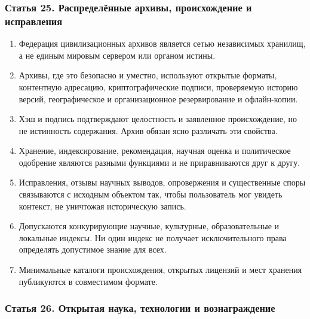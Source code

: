 \documentclass[
  russian,
  11pt,
  a4paper,
]{article}
\providecommand{\tightlist}{%
  \setlength{\itemsep}{0pt}\setlength{\parskip}{0pt}}
\begin{document}
\subsubsection{Статья 25. Распределённые архивы, происхождение и
исправления}\label{ux441ux442ux430ux442ux44cux44f-25-ux440ux430ux441ux43fux440ux435ux434ux435ux43bux451ux43dux43dux44bux435-ux430ux440ux445ux438ux432ux44b-ux43fux440ux43eux438ux441ux445ux43eux436ux434ux435ux43dux438ux435-ux438-ux438ux441ux43fux440ux430ux432ux43bux435ux43dux438ux44f}

\begin{enumerate}
\def\labelenumi{\arabic{enumi}.}
\tightlist
\item
  Федерация цивилизационных архивов является сетью независимых хранилищ,
  а не единым мировым сервером или органом истины.
\item
  Архивы, где это безопасно и уместно, используют открытые форматы,
  контентную адресацию, криптографические подписи, проверяемую историю
  версий, географическое и организационное резервирование и
  офлайн-копии.
\item
  Хэш и подпись подтверждают целостность и заявленное происхождение, но
  не истинность содержания. Архив обязан ясно различать эти свойства.
\item
  Хранение, индексирование, рекомендация, научная оценка и политическое
  одобрение являются разными функциями и не приравниваются друг к другу.
\item
  Исправления, отзывы научных выводов, опровержения и существенные споры
  связываются с исходным объектом так, чтобы пользователь мог увидеть
  контекст, не уничтожая историческую запись.
\item
  Допускаются конкурирующие научные, культурные, образовательные и
  локальные индексы. Ни один индекс не получает исключительного права
  определять допустимое знание для всех.
\item
  Минимальные каталоги происхождения, открытых лицензий и мест хранения
  публикуются в совместимом формате.
\end{enumerate}

\subsubsection{Статья 26. Открытая наука, технологии и
вознаграждение}\label{ux441ux442ux430ux442ux44cux44f-26-ux43eux442ux43aux440ux44bux442ux430ux44f-ux43dux430ux443ux43aux430-ux442ux435ux445ux43dux43eux43bux43eux433ux438ux438-ux438-ux432ux43eux437ux43dux430ux433ux440ux430ux436ux434ux435ux43dux438ux435}
\end{document}

